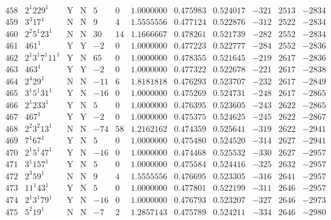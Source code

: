 \documentclass[11pt,reqno,a4letter]{article}
\numberwithin{figure}{section}
\numberwithin{table}{section}
\theoremstyle{plain}
\numberwithin{theorem}{section}
\theoremstyle{definition}
\begin{document}
\begin{table}[ht]
\begin{equation*}
{\begin{array}{cc|cc|ccc|cc|ccc}
 458 & 2^1 229^1 & \text{Y} & \text{N} & 5 & 0 & 1.0000000 & 0.475983 & 0.524017 & -321 & 2513 & -2834 \\
 459 & 3^3 17^1 & \text{N} & \text{N} & 9 & 4 & 1.5555556 & 0.477124 & 0.522876 & -312 & 2522 & -2834 \\
 460 & 2^2 5^1 23^1 & \text{N} & \text{N} & 30 & 14 & 1.1666667 & 0.478261 & 0.521739 & -282 & 2552 & -2834 \\
 461 & 461^1 & \text{Y} & \text{Y} & -2 & 0 & 1.0000000 & 0.477223 & 0.522777 & -284 & 2552 & -2836 \\
 462 & 2^1 3^1 7^1 11^1 & \text{Y} & \text{N} & 65 & 0 & 1.0000000 & 0.478355 & 0.521645 & -219 & 2617 & -2836 \\
 463 & 463^1 & \text{Y} & \text{Y} & -2 & 0 & 1.0000000 & 0.477322 & 0.522678 & -221 & 2617 & -2838 \\
 464 & 2^4 29^1 & \text{N} & \text{N} & -11 & 6 & 1.8181818 & 0.476293 & 0.523707 & -232 & 2617 & -2849 \\
 465 & 3^1 5^1 31^1 & \text{Y} & \text{N} & -16 & 0 & 1.0000000 & 0.475269 & 0.524731 & -248 & 2617 & -2865 \\
 466 & 2^1 233^1 & \text{Y} & \text{N} & 5 & 0 & 1.0000000 & 0.476395 & 0.523605 & -243 & 2622 & -2865 \\
 467 & 467^1 & \text{Y} & \text{Y} & -2 & 0 & 1.0000000 & 0.475375 & 0.524625 & -245 & 2622 & -2867 \\
 468 & 2^2 3^2 13^1 & \text{N} & \text{N} & -74 & 58 & 1.2162162 & 0.474359 & 0.525641 & -319 & 2622 & -2941 \\
 469 & 7^1 67^1 & \text{Y} & \text{N} & 5 & 0 & 1.0000000 & 0.475480 & 0.524520 & -314 & 2627 & -2941 \\
 470 & 2^1 5^1 47^1 & \text{Y} & \text{N} & -16 & 0 & 1.0000000 & 0.474468 & 0.525532 & -330 & 2627 & -2957 \\
 471 & 3^1 157^1 & \text{Y} & \text{N} & 5 & 0 & 1.0000000 & 0.475584 & 0.524416 & -325 & 2632 & -2957 \\
 472 & 2^3 59^1 & \text{N} & \text{N} & 9 & 4 & 1.5555556 & 0.476695 & 0.523305 & -316 & 2641 & -2957 \\
 473 & 11^1 43^1 & \text{Y} & \text{N} & 5 & 0 & 1.0000000 & 0.477801 & 0.522199 & -311 & 2646 & -2957 \\
 474 & 2^1 3^1 79^1 & \text{Y} & \text{N} & -16 & 0 & 1.0000000 & 0.476793 & 0.523207 & -327 & 2646 & -2973 \\
 475 & 5^2 19^1 & \text{N} & \text{N} & -7 & 2 & 1.2857143 & 0.475789 & 0.524211 & -334 & 2646 & -2980 \\

\end{array}}
\end{equation*}
\end{table}
\end{document}
